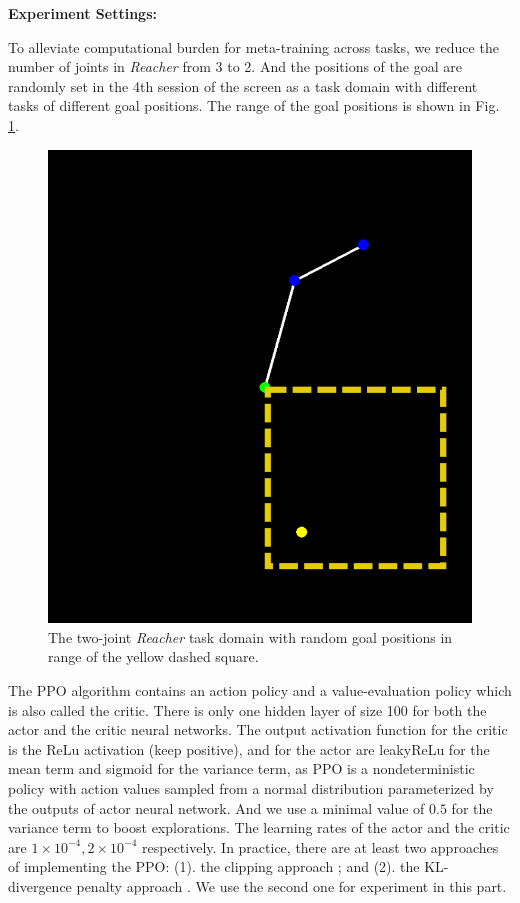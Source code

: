 \documentclass{article}
\begin{document}
\textbf{Experiment Settings:}

To alleviate computational burden for meta-training across tasks, we reduce the number of joints in \textit{Reacher} from 3 to 2. And the positions of the goal are randomly set in the 4th session of the screen as a task domain with different tasks of different goal positions. The range of the goal positions is shown in Fig. \ref{fig:meta_env}. 

\begin{figure}[htbp]
	\centering
	\includegraphics[scale=0.3]{img/meta_env.png}
	\caption{The two-joint \textit{Reacher} task domain with random goal positions in range of the yellow dashed square.}
	\label{fig:meta_env}
\end{figure}

The PPO algorithm contains an action policy and a value-evaluation policy which is also called the critic. There is only one hidden layer of size 100 for both the actor and the critic neural networks. The output activation function for the critic is the ReLu activation (keep positive), and for the actor are leakyReLu for the mean term and sigmoid for the variance term, as PPO is a nondeterministic policy with action values sampled from a normal distribution parameterized by the outputs of actor neural network. And we use a minimal value of $0.5$ for the variance term to boost explorations. The learning rates of the actor and the critic are $1\times10^{-4}, 2\times10^{-4}$ respectively. In practice, there are at least two approaches of implementing the PPO: (1). the clipping approach \cite{schulman2017proximal}; and (2). the KL-divergence penalty approach \cite{heess2017emergence}. We use the second one for experiment in this part.
\end{document}
